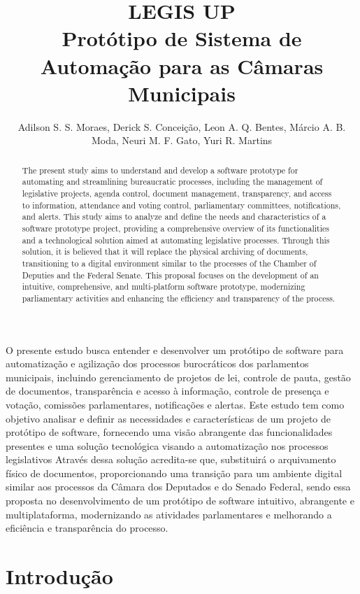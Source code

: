 \documentclass[12pt]{article}
\title{LEGIS UP\\ Protótipo de Sistema de Automação para as Câmaras Municipais}
\author{Adilson S. S. Moraes\inst{1}, Derick S. Conceição\inst{1}, Leon A. Q. Bentes\inst{1}, Márcio A. B. Moda\inst{1}, Neuri M. F. Gato\inst{1}, Yuri R. Martins\inst{1}}
\begin{document}
  

\maketitle

\begin{abstract}
  The present study aims to understand and develop a software prototype for automating and streamlining bureaucratic processes, including the management of legislative projects, agenda control, document management, transparency, and access to information, attendance and voting control, parliamentary committees, notifications, and alerts. This study aims to analyze and define the needs and characteristics of a software prototype project, providing a comprehensive overview of its functionalities and a technological solution aimed at automating legislative processes. Through this solution, it is believed that it will replace the physical archiving of documents, transitioning to a digital environment similar to the processes of the Chamber of Deputies and the Federal Senate. This proposal focuses on the development of an intuitive, comprehensive, and multi-platform software prototype, modernizing parliamentary activities and enhancing the efficiency and transparency of the process.
\end{abstract}
     
\begin{resumo} 
  O presente estudo busca entender e desenvolver um protótipo de software para automatização e agilização dos processos burocráticos dos parlamentos municipais, incluindo gerenciamento de projetos de lei, controle de pauta, gestão de documentos, transparência e acesso à informação, controle de presença e votação, comissões parlamentares, notificações e alertas. Este estudo tem como objetivo analisar e definir as necessidades e características de um projeto de protótipo de software, fornecendo uma visão abrangente das funcionalidades presentes e uma solução tecnológica visando a automatização nos processos legislativos Através dessa solução acredita-se que, substituirá o arquivamento físico de documentos, proporcionando uma transição para um ambiente digital similar aos processos da Câmara dos Deputados e do Senado Federal, sendo essa proposta no desenvolvimento de um protótipo de software intuitivo, abrangente e multiplataforma, modernizando as atividades parlamentares e melhorando a eficiência e transparência do processo.
\end{resumo}


\section{Introdução}
\end{document}
